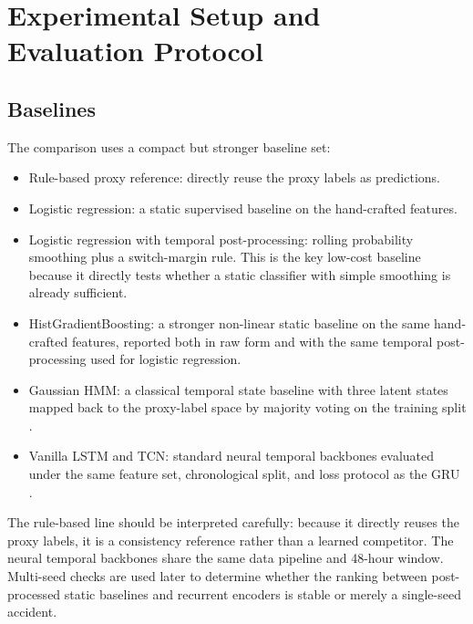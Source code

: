 \documentclass[a4paper,fleqn]{cas-dc}
\begin{document}
\section{Experimental Setup and Evaluation Protocol}
\subsection{Baselines}
The comparison uses a compact but stronger baseline set:
\begin{itemize}
\item Rule-based proxy reference: directly reuse the proxy labels as predictions.
\item Logistic regression: a static supervised baseline on the hand-crafted features.
\item Logistic regression with temporal post-processing: rolling probability smoothing plus a switch-margin rule. This is the key low-cost baseline because it directly tests whether a static classifier with simple smoothing is already sufficient.
\item HistGradientBoosting: a stronger non-linear static baseline on the same hand-crafted features, reported both in raw form and with the same temporal post-processing used for logistic regression.
\item Gaussian HMM: a classical temporal state baseline with three latent states mapped back to the proxy-label space by majority voting on the training split \cite{hamilton1989nonstationary,rabiner1989hmm,oelschlager2023bullbear}.
\item Vanilla LSTM and TCN: standard neural temporal backbones evaluated under the same feature set, chronological split, and loss protocol as the GRU \cite{hochreiter1997lstm,cho2014gru,bai2018tcn}.
\end{itemize}

The rule-based line should be interpreted carefully: because it directly reuses the proxy labels, it is a consistency reference rather than a learned competitor. The neural temporal backbones share the same data pipeline and 48-hour window. Multi-seed checks are used later to determine whether the ranking between post-processed static baselines and recurrent encoders is stable or merely a single-seed accident.
\end{document}
